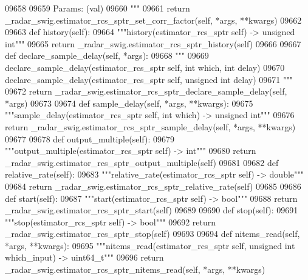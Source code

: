\begin{DoxyCode}
{{{{{{{{{{{{{{{{{{{{{{{{{{{{{{{09658 \textcolor{stringliteral}{}
09659 \textcolor{stringliteral}{        Params: (val)}
09660 \textcolor{stringliteral}{        """}
09661         \textcolor{keywordflow}{return} \_radar\_swig.estimator\_rcs\_sptr\_set\_corr\_factor(self, *args, **kwargs)
09662 
09663     \textcolor{keyword}{def }history(self):
09664         \textcolor{stringliteral}{"""history(estimator\_rcs\_sptr self) -> unsigned int"""}
09665         \textcolor{keywordflow}{return} \_radar\_swig.estimator\_rcs\_sptr\_history(self)
09666 
09667     \textcolor{keyword}{def }declare_sample_delay(self, *args):
09668         \textcolor{stringliteral}{"""}
09669 \textcolor{stringliteral}{        declare\_sample\_delay(estimator\_rcs\_sptr self, int which, int delay)}
09670 \textcolor{stringliteral}{        declare\_sample\_delay(estimator\_rcs\_sptr self, unsigned int delay)}
09671 \textcolor{stringliteral}{        """}
09672         \textcolor{keywordflow}{return} \_radar\_swig.estimator\_rcs\_sptr\_declare\_sample\_delay(self, *args)
09673 
09674     \textcolor{keyword}{def }sample_delay(self, *args, **kwargs):
09675         \textcolor{stringliteral}{"""sample\_delay(estimator\_rcs\_sptr self, int which) -> unsigned int"""}
09676         \textcolor{keywordflow}{return} \_radar\_swig.estimator\_rcs\_sptr\_sample\_delay(self, *args, **kwargs)
09677 
09678     \textcolor{keyword}{def }output_multiple(self):
09679         \textcolor{stringliteral}{"""output\_multiple(estimator\_rcs\_sptr self) -> int"""}
09680         \textcolor{keywordflow}{return} \_radar\_swig.estimator\_rcs\_sptr\_output\_multiple(self)
09681 
09682     \textcolor{keyword}{def }relative_rate(self):
09683         \textcolor{stringliteral}{"""relative\_rate(estimator\_rcs\_sptr self) -> double"""}
09684         \textcolor{keywordflow}{return} \_radar\_swig.estimator\_rcs\_sptr\_relative\_rate(self)
09685 
09686     \textcolor{keyword}{def }start(self):
09687         \textcolor{stringliteral}{"""start(estimator\_rcs\_sptr self) -> bool"""}
09688         \textcolor{keywordflow}{return} \_radar\_swig.estimator\_rcs\_sptr\_start(self)
09689 
09690     \textcolor{keyword}{def }stop(self):
09691         \textcolor{stringliteral}{"""stop(estimator\_rcs\_sptr self) -> bool"""}
09692         \textcolor{keywordflow}{return} \_radar\_swig.estimator\_rcs\_sptr\_stop(self)
09693 
09694     \textcolor{keyword}{def }nitems_read(self, *args, **kwargs):
09695         \textcolor{stringliteral}{"""nitems\_read(estimator\_rcs\_sptr self, unsigned int which\_input) -> uint64\_t"""}
09696         \textcolor{keywordflow}{return} \_radar\_swig.estimator\_rcs\_sptr\_nitems\_read(self, *args, **kwargs)
}}}}}}}}}}}}}}}}}}}}}}}}}}}}}}}
\end{DoxyCode}
